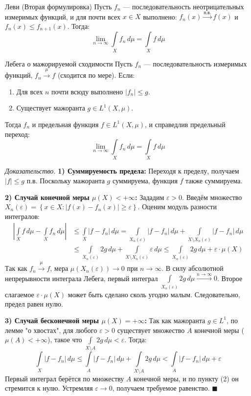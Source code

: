 \documentclass[12pt,a4paper]{article}
\newenvironment{Proof}[1][Доказательство]{\vspace{0.5em}\noindent\textit{#1.}\hspace{0.5em}\ignorespaces}{\hfill$\blacksquare$\vspace{1em}}
\begin{document}
\begin{Theorem}{Леви (Вторая формулировка)}{}
Пусть $f_n$ — последовательность неотрицательных измеримых функций, и для почти всех $x \in X$ выполнено: $f_n(x) \xrightarrow{\text{п.в.}} f(x)$ и $f_n(x) \le f_{n+1}(x)$. Тогда:
$$ \lim\limits_{n \to \infty} \int\limits_X f_n \, d\mu = \int\limits_X f \, d\mu $$
\end{Theorem}

\begin{Theorem}{Лебега о мажорируемой сходимости}{}
Пусть $f_n$ — последовательность измеримых функций, $f_n \xrightarrow{\mu} f$ (сходится по мере). Если:
\begin{enumerate}
    \item Для всех $n$ почти всюду выполнено $|f_n| \le g$.
    \item Существует мажоранта $g \in L^1(X, \mu)$.
\end{enumerate}
Тогда $f_n$ и предельная функция $f \in L^1(X, \mu)$, и справедлив предельный переход:
$$ \lim\limits_{n \to \infty} \int\limits_X f_n \, d\mu = \int\limits_X f \, d\mu $$
\end{Theorem}

\begin{Proof}
\textbf{1) Суммируемость предела:} Переходя к пределу, получаем $|f| \le g$ п.в. Поскольку мажоранта $g$ суммируема, функция $f$ также суммируема.

\textbf{2) Случай конечной меры $\mu(X) < +\infty$:} 
Зададим $\varepsilon > 0$. Введём множество $X_n(\varepsilon) = \left\{ x \in X : |f(x) - f_n(x)| \ge \varepsilon \right\}$.
Оценим модуль разности интегралов:
\begin{align*}
    \left| \int\limits_X f \, d\mu - \int\limits_X f_n \, d\mu \right| &\le \int\limits_X |f - f_n| \, d\mu = \int\limits_{X_n(\varepsilon)} |f - f_n| \, d\mu + \int\limits_{X \setminus X_n(\varepsilon)} |f - f_n| \, d\mu \\
    &\le \int\limits_{X_n(\varepsilon)} 2g \, d\mu + \int\limits_{X \setminus X_n(\varepsilon)} \varepsilon \, d\mu \le \int\limits_{X_n(\varepsilon)} 2g \, d\mu + \varepsilon \cdot \mu(X)
\end{align*}
Так как $f_n \xrightarrow{\mu} f$, мера $\mu(X_n(\varepsilon)) \to 0$ при $n \to \infty$. 
В силу абсолютной непрерывности интеграла Лебега, первый интеграл $\int\limits_{X_n(\varepsilon)} 2g \, d\mu \xrightarrow{n \to \infty} 0$. Второе слагаемое $\varepsilon \cdot \mu(X)$ может быть сделано сколь угодно малым. Следовательно, предел равен нулю.

\textbf{3) Случай бесконечной меры $\mu(X) = +\infty$:} 
Так как мажоранта $g \in L^1$, по лемме "о хвостах", для любого $\varepsilon > 0$ существует множество $A$ конечной меры ($\mu(A) < +\infty$), такое что $\int\limits_{X \setminus A} 2g \, d\mu < \varepsilon$.
Тогда:
$$ \int\limits_X |f - f_n| \, d\mu \le \int\limits_A |f - f_n| \, d\mu + \int\limits_{X \setminus A} 2g \, d\mu < \int\limits_A |f - f_n| \, d\mu + \varepsilon $$
Первый интеграл берётся по множеству $A$ конечной меры, и по пункту (2) он стремится к нулю. Устремляя $\varepsilon \to 0$, получаем требуемое равенство.
\end{Proof}
\end{document}
